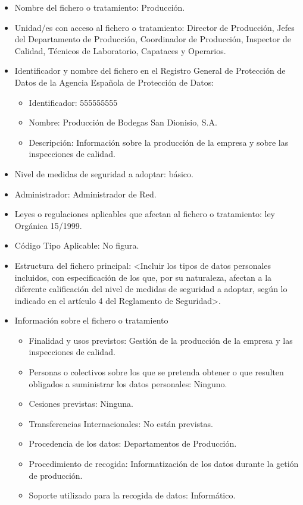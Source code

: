 \documentclass[a4paper,11pt,bibtotoc,noliststotoc]{scrbook}
\newcommand{\laorganizacion}{Bodegas San Dionisio, S.A.}
\begin{document}
\begin{itemize}
\item Nombre del fichero o tratamiento: Producción.

\item Unidad/es con acceso al fichero o tratamiento: Director de Producción, Jefes del Departamento de Producción, Coordinador de Producción, Inspector de Calidad, Técnicos de Laboratorio, Capataces y Operarios.

\item Identificador y nombre del fichero en el Registro General de Protección de Datos de la Agencia Española de Protección de Datos: 
	\begin{itemize}
	\item Identificador: 555555555
	\item Nombre: Producción de \laorganizacion
	\item Descripción: Información sobre la producción de la empresa y sobre las inspecciones de calidad.
	\end{itemize}

\item Nivel de medidas de seguridad a adoptar: básico.

\item Administrador: Administrador de Red.

\item Leyes o regulaciones aplicables que afectan al fichero o tratamiento: ley Orgánica 15/1999.

\item Código Tipo Aplicable: No figura.

\item Estructura del fichero principal: <Incluir los tipos de datos personales incluidos, con especificación de los que, por su naturaleza, afectan a la diferente calificación del nivel de medidas de seguridad a adoptar, según lo indicado en el artículo 4 del Reglamento de Seguridad>.

\item Información sobre el fichero o tratamiento
	\begin{itemize}
	\item Finalidad y usos previstos: Gestión de la producción de la empresa y las inspecciones de calidad.
	\item Personas o colectivos sobre los que se pretenda obtener o que resulten obligados a suministrar los datos personales: Ninguno.
	\item Cesiones previstas: Ninguna.
	\item Transferencias Internacionales: No están previstas.
	\item Procedencia de los datos: Departamentos de Producción.
	\item Procedimiento de recogida: Informatización de los datos durante la getión de producción.
	\item Soporte utilizado para la recogida de datos: Informático.
	\end{itemize}


\end{itemize}
\end{document}
